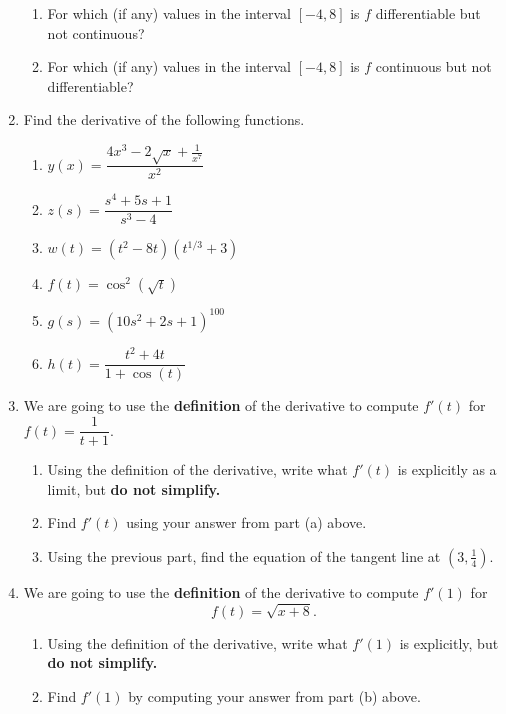 \documentclass[12pt]{article}
\begin{document}
\begin{enumerate}
\begin{enumerate}
		\item  For which (if any) values in the interval $[-4,8]$ is $f$ differentiable but not continuous?
		\vfill
		
		\item For which (if any) values in the interval $[-4,8]$ is $f$ continuous but not differentiable?
		\vfill
	\end{enumerate}
\pagebreak


 \item Find the derivative of the following functions.

 \begin{enumerate}
    \item $y(x) = \dfrac{4x^3 - 2\sqrt{x} + \frac{1}{x^7}}{x^2}$
    \vfill
    \item $z(s) = \dfrac{s^4 + 5s + 1}{s^3-4}$
    \vfill
    \item $w(t) = (t^2 - 8t)(t^{1/3} + 3)$
    \vfill

    \pagebreak

    \item $f(t) = \cos^2(\sqrt{t})$
    \vfill
    \item $g(s) = (10s^2 + 2s + 1)^{100}$
    \vfill
    \item $h(t) = \dfrac{t^2 + 4t}{1+\cos(t)}$
    \vfill
 \end{enumerate}

\pagebreak

\item  We are going to use  the \textbf{definition} of the derivative to compute $f'(t)$ for $f(t) = \dfrac{1}{t+1}.$

\begin{enumerate}
\item Using the definition of the derivative, write what $f'(t)$ is explicitly as a limit, but \textbf{do not simplify.}
\vspace{1in}
\item Find $f'(t)$ using your answer from part (a) above.
\vfill
\item Using the previous part, find the equation of the tangent line at $(3,\frac{1}{4})$.
\vspace{1in}
\end{enumerate}
\clearpage

\item  We are going to use  the \textbf{definition} of the derivative to compute $f'(1)$ for $$f(t) = \sqrt{x+8}.$$

\begin{enumerate}
\item Using the definition of the derivative, write what $f'(1)$ is explicitly, but \textbf{do not simplify.}
\vspace{1in}
\item Find $f'(1)$ by computing your answer from part (b) above.
\vfill
\end{enumerate}
\clearpage


\end{enumerate}
\end{document}
